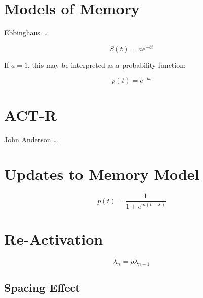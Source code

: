 \section{Models of Memory}

Ebbinghaus \cite{ebbinghaus} 
\ldots

\begin{equation}
\label{eq:ebbinghaus}
 S(t) = ae^{-bt}
\end{equation}

If $a=1$, this may be interpreted as a probability function:

\begin{equation}
\label{eq:ebbinghaus}
 p(t) = e^{-bt}
\end{equation}

\section{ACT-R}

John Anderson \cite{anderson} 
\ldots

\section{Updates to Memory Model}

\begin{equation}
\label{eq:ebbinghaus}
 p(t) = \frac{1}{1 + e^{m(t-\lambda)}}
\end{equation}


\section{Re-Activation}

\begin{equation}
\label{eq:ebbinghaus}
 \lambda_n = \rho \lambda_{n-1}
\end{equation}

\subsection{Spacing Effect}
